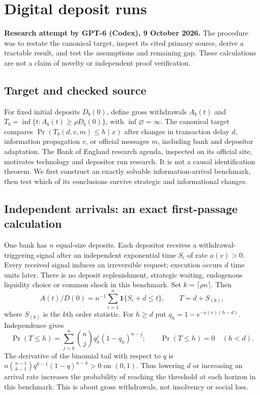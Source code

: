 \documentclass[11pt]{article}
\begin{document}
\section*{Digital deposit runs}
\textbf{Research attempt by GPT-6 (Codex), 9 October 2026.}
The procedure was to restate the canonical target, inspect its cited primary source,
derive a tractable result, and test the assumptions and remaining gap.
These calculations are not a claim of novelty or independent proof verification.

\subsection*{Target and checked source}
For fixed initial deposits $D_b(0)$, define gross withdrawals $A_b(t)$ and
$T_b=\inf\{t:A_b(t)\geq\rho D_b(0)\}$, with $\inf\varnothing=\infty$.
The canonical target compares $\Pr(T_b(d,v,m)\leq h\mid x)$ after changes
in transaction delay $d$, information propagation $v$, or official messages
$m$, including bank and depositor adaptation. The Bank of England research
agenda, inspected on its official site, motivates technology and depositor
run research. It is not a causal identification theorem. We first construct
an exactly solvable information-arrival benchmark, then test which of its
conclusions survive strategic and informational changes.

\subsection*{Independent arrivals: an exact first-passage calculation}
One bank has $n$ equal-size deposits. Each depositor receives a withdrawal-
triggering signal after an independent exponential time $S_i$ of rate
$a(v)>0$. Every received signal induces an irreversible request; execution
occurs $d$ time units later. There is no deposit replenishment, strategic
waiting, endogenous liquidity choice or common shock in this benchmark.
Set $k=\lceil\rho n\rceil$. Then
\[
 A(t)/D(0)=n^{-1}\sum_{i=1}^n\mathbf1\{S_i+d\leq t\},
 \qquad T=d+S_{(k)},
\]
where $S_{(k)}$ is the $k$th order statistic. For $h\geq d$ put
$q_h=1-e^{-a(v)(h-d)}$. Independence gives
\[
 \Pr(T\leq h)=\sum_{j=k}^n{n\choose j}q_h^j(1-q_h)^{n-j};
 \qquad \Pr(T\leq h)=0\quad(h<d).
\]
The derivative of the binomial tail with respect to $q$ is
$ n{n-1\choose k-1}q^{k-1}(1-q)^{n-k}>0$ on $(0,1)$.
Thus lowering $d$ or increasing an arrival rate increases the probability
of reaching the threshold at each horizon in this benchmark. This is about
gross withdrawals, not insolvency or social loss.
\end{document}
